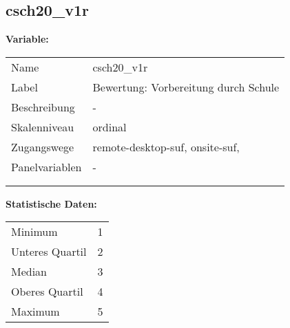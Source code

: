 	
	
	\subsection{csch20\_v1r}
	\label{subSection:csch20_v1r}

	\noindent\textbf{Variable:}\\
		\begin{tabular}{lL{11.3cm}}
			\label{tableVariable:csch20_v1r}
			Name & csch20\_v1r \\
			Label & Bewertung: Vorbereitung durch Schule \\
			Beschreibung & - \\
			Skalenniveau & ordinal \\
			Zugangswege &
				remote-desktop-suf,
				onsite-suf,
 \\
			Panelvariablen & -
			 \\
			 \\
 \\
		\end{tabular}



		\vspace*{1 cm}
		\noindent\textbf{Statistische Daten:}\\
			\begin{tabular}{ll}
				\label{tableStatistics:csch20_v1r}
					Minimum & 1 \\
					Unteres Quartil & 2 \\
					Median & 3 \\
					Oberes Quartil & 4 \\
					Maximum & 5 \\
			\end{tabular}



